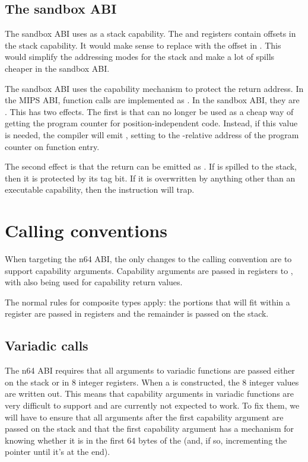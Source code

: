 \subsection{The sandbox ABI}

The sandbox ABI uses  as a stack capability.
The  and  registers contain offsets in the stack capability.
It would make sense to replace  with the offset in .
This would simplify the addressing modes for the stack and make a lot of spills cheaper in the sandbox ABI.

The sandbox ABI uses the capability mechanism to protect the return address.
In the MIPS ABI, function calls are implemented as .
In the sandbox ABI, they are .
This has two effects.
The first is that  can no longer be used as a cheap way of getting the program counter for position-independent code.
Instead, if this value is needed, the compiler will emit , setting  to the -relative address of the program counter on function entry.

The second effect is that the return can be emitted as .%
If  is spilled to the stack, then it is protected by its tag bit.
If it is overwritten by anything other than an executable capability, then the  instruction will trap.

\section{Calling conventions}

When targeting the n64 ABI, the only changes to the calling convention are to support capability arguments.
Capability arguments are passed in registers  to , with  also being used for capability return values.

The normal rules for composite types apply: the portions that will fit within a register are passed in registers and the remainder is passed on the stack.

\subsection{Variadic calls}

The n64 ABI requires that all arguments to variadic functions are passed either on the stack or in 8 integer registers.
When a  is constructed, the 8 integer values are written out.
This means that capability arguments in variadic functions are very difficult to support and are currently not expected to work.
To fix them, we will have to ensure that all arguments after the first capability argument are passed on the stack and that the first capability argument has a mechanism for knowing whether it is in the first 64 bytes of the  (and, if so, incrementing the pointer until it's at the end).

